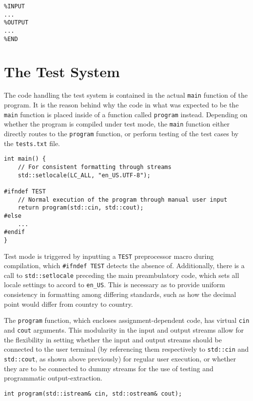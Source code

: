 \documentclass[12pt]{article}
\begin{document}
\begin{verbatim}
%INPUT
...
%OUTPUT
...
%END
\end{verbatim}

\section{The Test System}

The code handling the test system is contained in the actual \texttt{main} function of the program. It is the reason behind why the code in what was expected to be the \texttt{main} function is placed inside of a function called \texttt{program} instead. Depending on whether the program is compiled under test mode, the \texttt{main} function either directly routes to the \texttt{program} function, or perform testing of the test cases by the \texttt{tests.txt} file.

\begin{verbatim}
int main() {
    // For consistent formatting through streams
    std::setlocale(LC_ALL, "en_US.UTF-8");

#ifndef TEST
    // Normal execution of the program through manual user input
    return program(std::cin, std::cout);
#else
    ...
#endif
}
\end{verbatim}

Test mode is triggered by inputting a \texttt{TEST} preprocessor macro during compilation, which \texttt{\#ifndef TEST} detects the absence of. Additionally, there is a call to \texttt{std::setlocale} preceding the main preambulatory code, which sets all locale settings to accord to \texttt{en\_US}. This is necessary as to provide uniform consistency in formatting among differing standards, such as how the decimal point would differ from country to country.

The \texttt{program} function, which encloses assignment-dependent code, has virtual \texttt{cin} and \texttt{cout} arguments. This modularity in the input and output streams allow for the flexibility in setting whether the input and output streams should be connected to the user terminal (by referencing them respectively to \texttt{std::cin} and \texttt{std::cout}, as shown above previously) for regular user execution, or whether they are to be connected to dummy streams for the use of testing and programmatic output-extraction.

\begin{verbatim}
int program(std::istream& cin, std::ostream& cout);
\end{verbatim}
\end{document}
